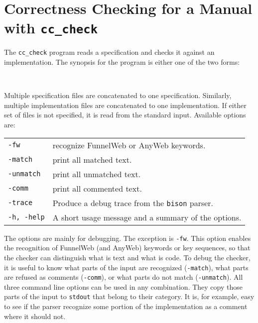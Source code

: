 \documentclass[12pt]{article}
\makeatletter
\newcommand{\TTindex}[1]{\index{#1@{\tt #1}}}
\def\ind{\hspace*{7mm}}
\makeatother
\begin{document}
\section{Correctness Checking for a Manual with {\tt cc\_check}}
\label{sectionChecker}
\TTindex{cc\_check}

The {\tt cc\_check} program reads a specification and checks it
against an implementation. The synopsis for
the program is either one of the two forms:

\ind{\tt cc\_check <spec-files...> [-against [<options>] <impl-files...>]}\\
\ind{\tt cc\_check -against [<options>] <impl-files...>}

Multiple specification files are concatenated to one specification.
Similarly, multiple implementation files are concatenated to one
implementation. If either set of files is not specified, it is read
from the standard input. Available options are:

\begin{tabular}{ll}
    {\tt -fw}      & recognize FunnelWeb or AnyWeb keywords.\\
    {\tt -match}   & print all matched text.\\
    {\tt -unmatch} & print all unmatched text.\\
    {\tt -comm}    & print all commented text.\\
    {\tt -trace} & Produce a debug trace from the {\tt bison} parser. \\
    {\tt -h, -help} & A short usage message and a summary of the options.
\end{tabular}

The options are mainly for debugging. The exception is {\tt -fw}.
This option enables the recognition of FunnelWeb (and AnyWeb) keywords
or key sequences, so that the checker can distinguish what is text and
what is code. To debug the checker, it is useful to know what parts
of the input are recognized ({\tt -match}), what parts are refused as
comments ({\tt -comm}), or what parts do not match ({\tt -unmatch}).
All three command line options can be used in any combination. They
copy those parts of the input to {\tt stdout} that belong to their
category. It is, for example, easy to see if the parser recognize
some portion of the implementation as a comment where it should not.
\end{document}
